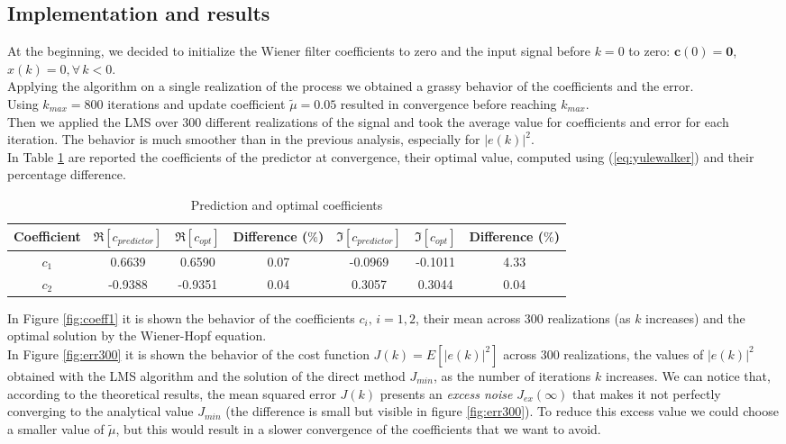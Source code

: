 \documentclass[a4paper, 12pt]{report}
\begin{document}
\subsection*{Implementation and results}
At the beginning, we decided to initialize the Wiener filter coefficients to zero and the input signal before $k=0$ to zero: $\mathbf{c}(0) = \mathbf{0}$, $x(k) = 0, \forall \, k<0$. \\
Applying the algorithm on a single realization of the process we obtained a grassy behavior of the coefficients and the error.\\
Using $k_{max} = 800$ iterations and update coefficient $\tilde{\mu} = 0.05$ resulted in convergence before reaching $k_{max}$.\\
Then we applied the LMS over 300 different realizations of the signal and took the average value for coefficients and error for each iteration. The behavior is much smoother than in the previous analysis, especially for $|e(k)|^2$.\\
In Table \ref{tab:predopt} are reported the coefficients of the predictor at convergence, their optimal value, computed using (\ref{eq:yulewalker}) and their percentage difference.

\begin{table}[H]
	\centering
	\begin{tabular}{c|cc|c|cc|c}
	\toprule
	Coefficient	& $\Re[c_{predictor}]$ 	& $\Re[c_{opt}]$	& Difference ($\%$)	& $\Im[c_{predictor}]$	& $\Im[c_{opt}]$ & Difference ($\%$) \\
	\midrule
	$c_1$ 	& 0.6639	& 0.6590		& 0.07 & -0.0969	& -0.1011	& 4.33 \\
	$c_2$	& -0.9388	& -0.9351		& 0.04 & 0.3057		& 0.3044 	& 0.04 \\
	\bottomrule
	\end{tabular}
	\caption{Prediction and optimal coefficients}
	\label{tab:predopt}
\end{table}

In Figure \ref{fig:coeff1} it is shown the behavior of the coefficients $c_i, \, i=1,2$,  their mean across 300 realizations (as $k$ increases) and the optimal solution by the Wiener-Hopf equation.\\
In Figure \ref{fig:err300} it is shown the behavior of the cost function $J(k) = E \left[ |e(k)|^2 \right]$  across 300 realizations, the values of $|e(k)|^2$ obtained with the LMS algorithm and the solution of the direct method $J_{min}$, as the number of iterations $k$ increases. We can notice that, according to the theoretical results, the mean squared error $J(k)$ presents an \emph{excess noise} $J_{ex}(\infty)$ that makes it not perfectly converging to the analytical value $J_{min}$ (the difference is small but visible in figure \ref{fig:err300}). To reduce this excess value we could choose a smaller value of $\tilde{\mu}$, but this would result in a slower convergence of the coefficients that we want to avoid.
\end{document}
